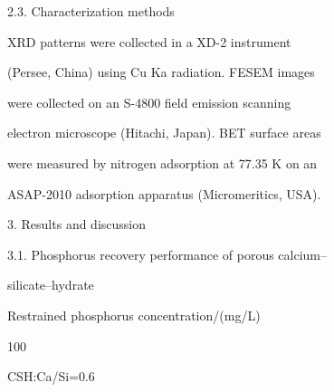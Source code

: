 \documentclass[a4paper,portrait,12pt]{article}
\begin{document}
\begin{flushleft}
2.3. Characterization methods
\end{flushleft}


\begin{flushleft}
XRD patterns were collected in a XD-2 instrument
\end{flushleft}


\begin{flushleft}
(Persee, China) using Cu Ka radiation. FESEM images
\end{flushleft}


\begin{flushleft}
were collected on an S-4800 ﬁeld emission scanning
\end{flushleft}


\begin{flushleft}
electron microscope (Hitachi, Japan). BET surface areas
\end{flushleft}


\begin{flushleft}
were measured by nitrogen adsorption at 77.35 K on an
\end{flushleft}


\begin{flushleft}
ASAP-2010 adsorption apparatus (Micromeritics, USA).
\end{flushleft}


\begin{flushleft}
3. Results and discussion
\end{flushleft}


\begin{flushleft}
3.1. Phosphorus recovery performance of porous calcium--
\end{flushleft}


\begin{flushleft}
silicate--hydrate
\end{flushleft}





\begin{flushleft}
Restrained phosphorus concentration/(mg/L)
\end{flushleft}





100





\begin{flushleft}
CSH:Ca/Si=0.6
\end{flushleft}
\end{document}
